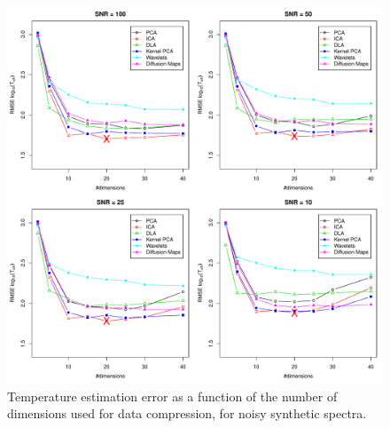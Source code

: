\documentclass[a4paper,fleqn,usenatbib]{mnras}
\begin{document}
{{{\begin{figure}
\centering\includegraphics[width=\textwidth]{flamesHR10_Teff_log_BestSVM_N-RMSE_test.pdf}
\caption{Temperature estimation error as a function of the number of
  dimensions used for data compression, for noisy synthetic
  spectra.}
\label{fig:02}
\end{figure}


}}}
\end{document}

